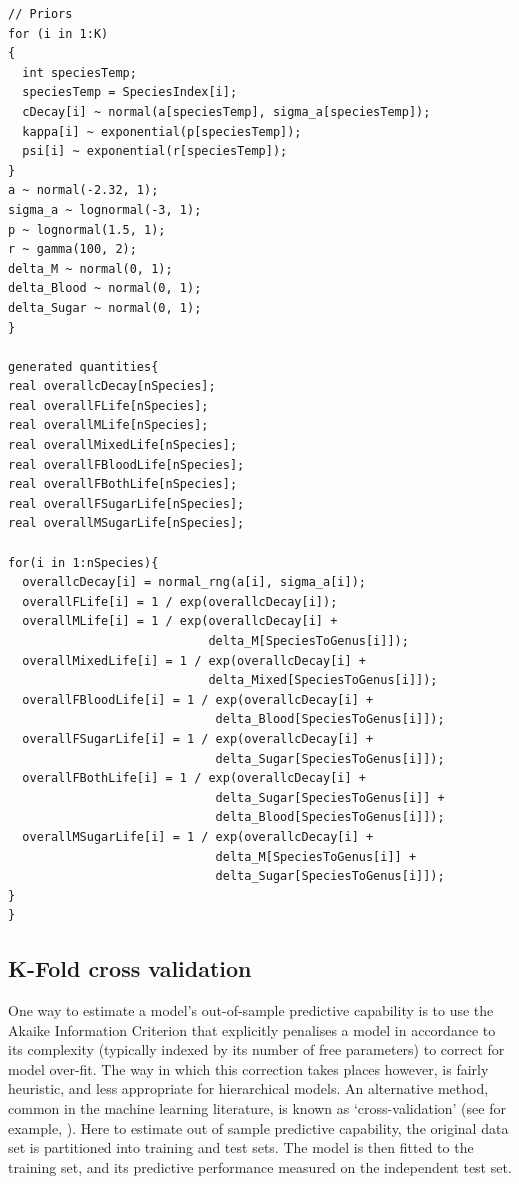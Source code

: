\documentclass[12pt]{article}
\begin{document}
\begin{verbatim}
// Priors
for (i in 1:K)
{
  int speciesTemp;
  speciesTemp = SpeciesIndex[i];
  cDecay[i] ~ normal(a[speciesTemp], sigma_a[speciesTemp]);
  kappa[i] ~ exponential(p[speciesTemp]);  
  psi[i] ~ exponential(r[speciesTemp]);
}
a ~ normal(-2.32, 1);
sigma_a ~ lognormal(-3, 1);
p ~ lognormal(1.5, 1);
r ~ gamma(100, 2);
delta_M ~ normal(0, 1);
delta_Blood ~ normal(0, 1);
delta_Sugar ~ normal(0, 1);
}

generated quantities{
real overallcDecay[nSpecies];
real overallFLife[nSpecies];
real overallMLife[nSpecies];
real overallMixedLife[nSpecies];
real overallFBloodLife[nSpecies];
real overallFBothLife[nSpecies];
real overallFSugarLife[nSpecies];
real overallMSugarLife[nSpecies];

for(i in 1:nSpecies){
  overallcDecay[i] = normal_rng(a[i], sigma_a[i]);
  overallFLife[i] = 1 / exp(overallcDecay[i]);
  overallMLife[i] = 1 / exp(overallcDecay[i] +
                            delta_M[SpeciesToGenus[i]]);
  overallMixedLife[i] = 1 / exp(overallcDecay[i] +
                            delta_Mixed[SpeciesToGenus[i]]);
  overallFBloodLife[i] = 1 / exp(overallcDecay[i] +
                             delta_Blood[SpeciesToGenus[i]]);
  overallFSugarLife[i] = 1 / exp(overallcDecay[i] +
                             delta_Sugar[SpeciesToGenus[i]]);
  overallFBothLife[i] = 1 / exp(overallcDecay[i] +
                             delta_Sugar[SpeciesToGenus[i]] +
                             delta_Blood[SpeciesToGenus[i]]);
  overallMSugarLife[i] = 1 / exp(overallcDecay[i] +
                             delta_M[SpeciesToGenus[i]] +
                             delta_Sugar[SpeciesToGenus[i]]);
}
}
\end{verbatim}

\subsection{K-Fold cross validation}\label{sec:mrr_kFold}
One way to estimate a model's out-of-sample predictive capability is to use the Akaike Information Criterion that explicitly penalises a model in accordance to its complexity (typically indexed by its number of free parameters) to correct for model over-fit. The way in which this correction takes places however, is fairly heuristic, and less appropriate for hierarchical models. An alternative method, common in the machine learning literature, is known as `cross-validation' (see for example, \cite{kohavi1995study}). Here to estimate out of sample predictive capability, the original data set is partitioned into training and test sets. The model is then fitted to the training set, and its predictive performance measured on the independent test set.
\end{document}
